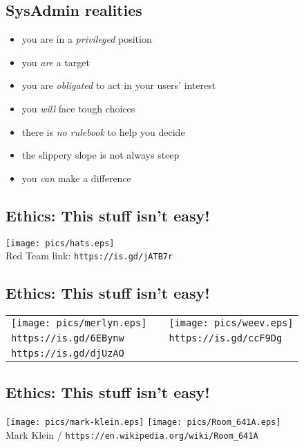\documentclass[xga]{xdvislides}
\begin{document}
\subsection{SysAdmin realities}
\begin{itemize}
	\item you are in a {\em privileged} position
	\item you {\em are} a target
	\item you are {\em obligated} to act in your users' interest
	\item you {\em will} face tough choices
	\item there is {\em no rulebook} to help you decide
	\item the slippery slope is not always steep
	\item you {\em can} make a difference
\end{itemize}

\subsection{Ethics: This stuff isn't easy!}

\vspace{.5in}
\begin{center}
       \texttt{[image: pics/hats.eps]} \\
	\small
	Red Team link: {\tt https://is.gd/jATB7r}
	\Normalsize
\end{center}

\subsection{Ethics: This stuff isn't easy!}
\vspace*{\fill}
\begin{center}
\begin{tabular}{ l c l }
\texttt{[image: pics/merlyn.eps]} &
\hspace{.5in} &
\texttt{[image: pics/weev.eps]} \\
{\tt https://is.gd/6EBynw} &  \hspace{.5in} & {\tt https://is.gd/ccF9Dg}\\
{\tt https://is.gd/djUzAO} \\
\end{tabular}
\end{center}
\vspace*{\fill}
\Normalsize


\subsection{Ethics: This stuff isn't easy!}
\vspace{.5in}
\begin{center}
       \texttt{[image: pics/mark-klein.eps]}
       \texttt{[image: pics/Room\_641A.eps]} \\

	\small
	Mark Klein / {\tt https://en.wikipedia.org/wiki/Room\_641A}
	\Normalsize
\end{center}
\end{document}
